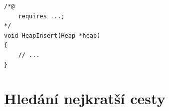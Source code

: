 %
%
%




\begin{verbatim}
/*@
    requires ...;
*/
void HeapInsert(Heap *heap)
{
    // ...
}
\end{verbatim}

\lipsum[2] \cite{def:1, def:2}

\chapter{Hledání nejkratší cesty}

